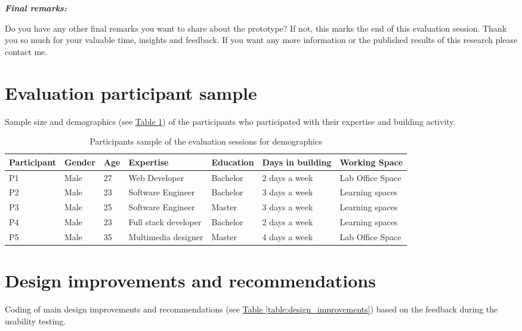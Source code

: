 \begin{appendices}
\textit{\textbf{Final remarks:}}

Do you have any other final remarks you want to share about the prototype?  If not, this marks the end of this evaluation session. Thank you so much for your valuable time, insights and feedback. If you want any more information or the published results of this research please contact me.\\

\newpage

\section{Evaluation participant sample}
\label{appendix:participants}

Sample size and demographics (see \hyperref[table:participants]{Table \ref{table:participants}}) of the participants who participated with their expertise and building activity.

\begin{table}[h!]
\centering
\begin{tabular}{| p{2cm} | p{1.5cm} | p{1cm} | p{3cm} | p{2cm} | p{3cm} | p{3cm} |}
\hline
\textbf{Participant} & \textbf{Gender} & \textbf{Age} & \textbf{Expertise} & \textbf{Education} & \textbf{Days in building} & \textbf{Working Space} \\ 
\hline
P1 & Male & 27 & Web Developer & Bachelor & 2 days a week & Lab Office Space \\ 
\hline
P2 & Male & 23 & Software Engineer & Bachelor & 3 days a week &  Learning spaces \\ 
\hline
P3 & Male & 25 & Software Engineer & Master & 3 days a week & Learning spaces \\ 
\hline
P4 & Male & 23 & Full stack developer & Bachelor & 2 days a week & Learning spaces \\ 
\hline
P5 & Male & 35 & Multimedia designer & Master & 4 days a week & Lab Office Space \\ 
\hline
\end{tabular}
\caption{Participants sample of the evaluation sessions for demographics}
\label{table:participants}
\end{table}


\section{Design improvements and recommendations}
\label{appendix:improvements}

Coding of main design improvements and recommendations (see \hyperref[table:design_improvements]{Table \ref{table:design_improvements}}) based on the feedback during the usability testing.



\end{appendices}
